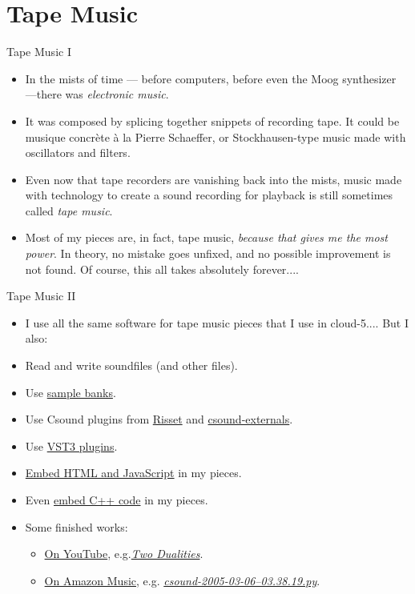 \documentclass{beamer}
\begin{document}
\section{Tape Music}
\begin{frame}{Tape Music I}

\begin{itemize}
\item In the mists of time --- before computers, before even the Moog synthesizer ---there was \emph{electronic music}.
\item It was composed by splicing together snippets of recording tape. It could be musique concrète à la Pierre Schaeffer, or Stockhausen-type music made with oscillators and filters.
\item Even now that tape recorders are vanishing back into the mists, music made with technology to create a sound recording for playback is still sometimes called \emph{tape music}.
\item Most of my pieces are, in fact, tape music, \emph{because that gives me the most power}. In theory, no mistake goes unfixed, and no possible improvement is not found. Of course, this all takes absolutely forever....
\end{itemize}
\end{frame}

\begin{frame}{Tape Music II}

\begin{itemize}
\item I use all the same software for tape music pieces that I use in cloud-5.... But I also:
\item Read and write soundfiles (and other files).
\item Use \href{https://www.zanderjaz.com/downloads/soundfonts}{sample banks}.
\item Use Csound plugins from \href{https://github.com/csound-plugins/risset-data/tree/master}{Risset} and \href{https://github.com/csound-plugins/csound-externals}{csound-externals}.
\item Use \href{https://github.com/gogins/csound-vst3-opcodes}{VST3 plugins}.
\item \href{https://github.com/gogins/csound-webserver-opcodes}{Embed HTML and JavaScript} in my pieces.
\item Even \href{https://github.com/gogins/csound-cxx-opcodes}{embed C++ code} in my pieces.
\item Some finished works: 
\begin{itemize}
\item \href{https://www.youtube.com/@michaelgogins}{On YouTube}, e.g.\href{https://music.youtube.com/watch?v=3_ahbL44p-E&si=2ScceuKnI0Pqye5G}{\emph{Two Dualities}}.
\item \href{https://music.amazon.com/artists/B0016KQMPA/michael-gogins}{On Amazon Music}, e.g. \href{https://music.amazon.com/albums/B0016UPQRK?trackAsin=B0016UGIW2\&do=play\&ref=dm_sh_26UFIwpvtSDIIQmF2rIxH1qXC}{\emph{csound-2005-03-06--03.38.19.py}}.

\end{itemize}
\end{itemize}

\end{frame}
\end{document}
